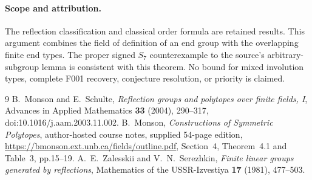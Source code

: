 \documentclass[11pt,a4paper]{article}
\begin{document}
\paragraph{Scope and attribution.}
The reflection classification and classical order formula are retained
results. This argument combines the field of definition of an end
group with the overlapping finite end types. The proper signed
$S_7$ counterexample to the source's arbitrary-subgroup lemma is
consistent with this theorem. No bound for mixed involution types,
complete F001 recovery, conjecture resolution, or priority is claimed.

\begin{thebibliography}{9}
 B.~Monson and E.~Schulte, \emph{Reflection groups and
polytopes over finite fields, I}, Advances in Applied Mathematics
\textbf{33} (2004), 290--317, doi:10.1016/j.aam.2003.11.002.
 B.~Monson, \emph{Constructions of Symmetric Polytopes},
author-hosted course notes, supplied 54-page edition,
\url{https://bmonson.ext.unb.ca/fields/outline.pdf}, Section~4,
Theorem~4.1 and Table~3, pp.15--19.
 A.~E.~Zalesskii and V.~N.~Serezhkin,
\emph{Finite linear groups generated by reflections},
Mathematics of the USSR-Izvestiya \textbf{17} (1981), 477--503.
\end{thebibliography}
\end{document}
